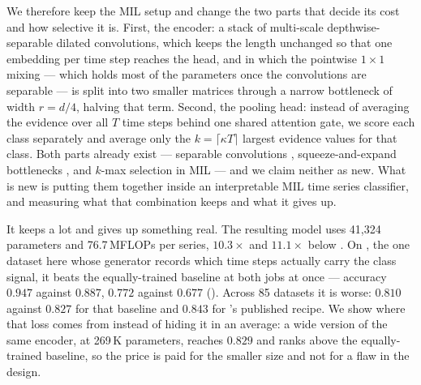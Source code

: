 We therefore keep the MIL setup and change the two parts that decide its cost and how selective it
is. First, the encoder: a stack of multi-scale depthwise-separable dilated convolutions, which keeps
the length unchanged so that one embedding per time step reaches the head, and in which the pointwise
$1\times1$ mixing --- which holds most of the parameters once the convolutions are separable --- is
split into two smaller matrices through a narrow bottleneck of width $r = d/4$, halving that term.
Second, the pooling head: instead of averaging the evidence over all $T$ time steps behind one shared
attention gate, we score each class separately and average only the $k = \lceil \kappa T \rceil$
largest evidence values for that class. Both parts already exist --- separable convolutions
\citep{chollet2017xception, howard2017mobilenets}, squeeze-and-expand bottlenecks
\citep{he2016resnet, iandola2016squeezenet, sandler2018mobilenetv2}, and $k$-max selection in MIL
\citep{durand2016weldon} --- and we claim neither as new. What is new is putting them together inside
an interpretable MIL time series classifier, and measuring what that combination keeps and what it
gives up.

It keeps a lot and gives up something real. The resulting model uses 41{,}324 parameters and
76.7\,MFLOPs per series, $10.3\times$ and $11.1\times$ below \millet{}. On \webtraffic{}, the one
dataset here whose generator records which time steps actually carry the class signal, it beats the
equally-trained baseline at both jobs at once --- accuracy $0.947$ against $0.887$, \ndcg{} $0.772$
against $0.677$ (). Across 85 \ucr{} datasets it is worse: $0.810$ against $0.827$
for that baseline and $0.843$ for \millet{}'s published recipe. We show where that loss comes from
instead of hiding it in an average: a wide version of the same encoder, at 269\,K parameters, reaches
$0.829$ and ranks above the equally-trained baseline, so the price is paid for the smaller size and
not for a flaw in the design.

